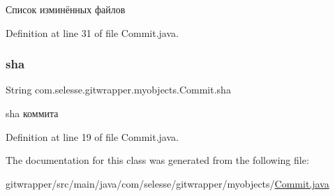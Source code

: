 Список изминённых файлов 



Definition at line 31 of file Commit.\+java.

\mbox{\label{classcom_1_1selesse_1_1gitwrapper_1_1myobjects_1_1_commit_a0922f957c3a176404df5610c4922eb93}} 
\subsubsection{\texorpdfstring{sha}{sha}}
{\footnotesize\ttfamily String com.\+selesse.\+gitwrapper.\+myobjects.\+Commit.\+sha\hspace{0.3cm}{\ttfamily [private]}}



sha коммита 



Definition at line 19 of file Commit.\+java.



The documentation for this class was generated from the following file\+:\begin{DoxyCompactItemize}
\item 
gitwrapper/src/main/java/com/selesse/gitwrapper/myobjects/\hyperlink{_commit_8java}{Commit.\+java}\end{DoxyCompactItemize}
